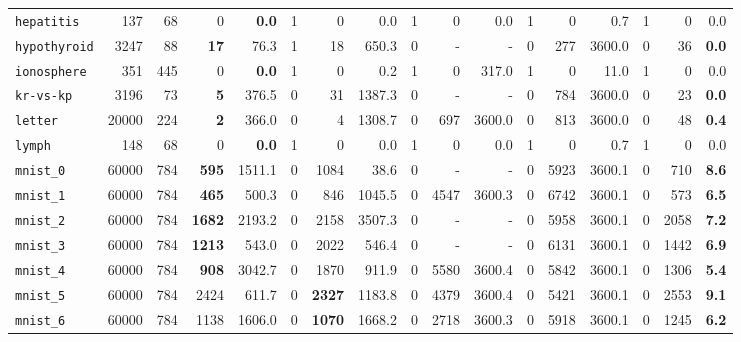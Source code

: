 \begin{tabular}{lccrrrrrrrrrrrrrr}
\texttt{hepatitis} & \multicolumn{1}{r}{137} & \multicolumn{1}{r}{68}  & 0 & \textbf{0.0} & 1 & 0 & 0.0 & 1 & 0 & 0.0 & 1 & 0 & 0.7 & 1 & 0 & 0.0\\
\texttt{hypothyroid} & \multicolumn{1}{r}{3247} & \multicolumn{1}{r}{88}  & \textbf{17} & 76.3 & 1 & 18 & 650.3 & 0 & - & - & 0 & 277 & 3600.0 & 0 & 36 & \textbf{0.0}\\
\texttt{ionosphere} & \multicolumn{1}{r}{351} & \multicolumn{1}{r}{445}  & 0 & \textbf{0.0} & 1 & 0 & 0.2 & 1 & 0 & 317.0 & 1 & 0 & 11.0 & 1 & 0 & 0.0\\
\texttt{kr-vs-kp} & \multicolumn{1}{r}{3196} & \multicolumn{1}{r}{73}  & \textbf{5} & 376.5 & 0 & 31 & 1387.3 & 0 & - & - & 0 & 784 & 3600.0 & 0 & 23 & \textbf{0.0}\\
\texttt{letter} & \multicolumn{1}{r}{20000} & \multicolumn{1}{r}{224}  & \textbf{2} & 366.0 & 0 & 4 & 1308.7 & 0 & 697 & 3600.0 & 0 & 813 & 3600.0 & 0 & 48 & \textbf{0.4}\\
\texttt{lymph} & \multicolumn{1}{r}{148} & \multicolumn{1}{r}{68}  & 0 & \textbf{0.0} & 1 & 0 & 0.0 & 1 & 0 & 0.0 & 1 & 0 & 0.7 & 1 & 0 & 0.0\\
\texttt{mnist\_0} & \multicolumn{1}{r}{60000} & \multicolumn{1}{r}{784}  & \textbf{595} & 1511.1 & 0 & 1084 & 38.6 & 0 & - & - & 0 & 5923 & 3600.1 & 0 & 710 & \textbf{8.6}\\
\texttt{mnist\_1} & \multicolumn{1}{r}{60000} & \multicolumn{1}{r}{784}  & \textbf{465} & 500.3 & 0 & 846 & 1045.5 & 0 & 4547 & 3600.3 & 0 & 6742 & 3600.1 & 0 & 573 & \textbf{6.5}\\
\texttt{mnist\_2} & \multicolumn{1}{r}{60000} & \multicolumn{1}{r}{784}  & \textbf{1682} & 2193.2 & 0 & 2158 & 3507.3 & 0 & - & - & 0 & 5958 & 3600.1 & 0 & 2058 & \textbf{7.2}\\
\texttt{mnist\_3} & \multicolumn{1}{r}{60000} & \multicolumn{1}{r}{784}  & \textbf{1213} & 543.0 & 0 & 2022 & 546.4 & 0 & - & - & 0 & 6131 & 3600.1 & 0 & 1442 & \textbf{6.9}\\
\texttt{mnist\_4} & \multicolumn{1}{r}{60000} & \multicolumn{1}{r}{784}  & \textbf{908} & 3042.7 & 0 & 1870 & 911.9 & 0 & 5580 & 3600.4 & 0 & 5842 & 3600.1 & 0 & 1306 & \textbf{5.4}\\
\texttt{mnist\_5} & \multicolumn{1}{r}{60000} & \multicolumn{1}{r}{784}  & 2424 & 611.7 & 0 & \textbf{2327} & 1183.8 & 0 & 4379 & 3600.4 & 0 & 5421 & 3600.1 & 0 & 2553 & \textbf{9.1}\\
\texttt{mnist\_6} & \multicolumn{1}{r}{60000} & \multicolumn{1}{r}{784}  & 1138 & 1606.0 & 0 & \textbf{1070} & 1668.2 & 0 & 2718 & 3600.3 & 0 & 5918 & 3600.1 & 0 & 1245 & \textbf{6.2}\\

\end{tabular}
